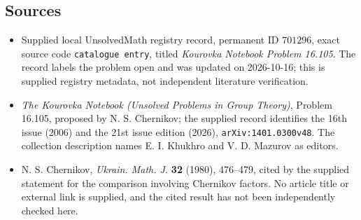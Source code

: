 \documentclass[11pt]{article}
\begin{document}
\subsection{Sources}
\begin{itemize}
\item Supplied local UnsolvedMath registry record, permanent ID \(701296\), exact source code \texttt{catalogue entry}, titled \emph{Kourovka Notebook Problem 16.105}. The record labels the problem open and was updated on 2026-10-16; this is supplied registry metadata, not independent literature verification.
\item \emph{The Kourovka Notebook (Unsolved Problems in Group Theory)}, Problem 16.105, proposed by N. S. Chernikov; the supplied record identifies the 16th issue (2006) and the 21st issue edition (2026), \texttt{arXiv:1401.0300v48}. The collection description names E. I. Khukhro and V. D. Mazurov as editors.
\item N. S. Chernikov, \emph{Ukrain. Math. J.} \textbf{32} (1980), 476--479, cited by the supplied statement for the comparison involving Chernikov factors. No article title or external link is supplied, and the cited result has not been independently checked here.
\end{itemize}
\end{document}
